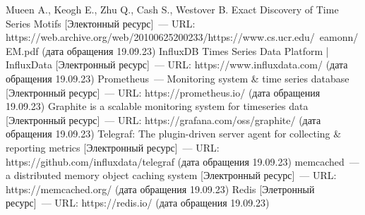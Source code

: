 \begin{thebibliography}{}
	 Mueen A., Keogh E., Zhu Q., Cash S., Westover B. Exact Discovery of Time Series Motifs [Электонный ресурс]~--- URL: https://web.archive.org/web/20100625200233/https://www.cs.ucr.edu/~eamonn/EM.pdf (дата обращения 19.09.23)
	 InfluxDB Times Series Data Platform | InfluxData [Электронный ресурс]~--- URL: https://www.influxdata.com/ (дата обращения 19.09.23)
	 Prometheus~--- Monitoring system \& time series database [Электронный ресурс]~--- URL: https://prometheus.io/ (дата обращения 19.09.23)
	 Graphite is a scalable monitoring system for timeseries data [Электронный ресурс]~--- URL: https://grafana.com/oss/graphite/ (дата обращения 19.09.23)
	 Telegraf: The plugin-driven server agent for collecting \& reporting metrics [Электронный ресурс]~--- URL: https://github.com/influxdata/telegraf (дата обращения 19.09.23)
	 memcached~--- a distributed memory object caching system [Электронный ресурс]~--- URL: https://memcached.org/ (дата обращения 19.09.23)
	 Redis [Элетронный ресурс]~--- URL: https://redis.io/ (дата обращения 19.09.23)
\end{thebibliography}
